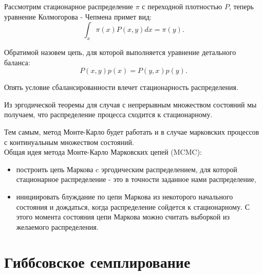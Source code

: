 \documentclass[14pt,a4paper]{article}
\begin{document}
Рассмотрим стационарное распределение $\pi$ с переходной плотностью $P$, теперь уравнение Колмогорова - Чепмена \cite{fell} примет вид:
\begin{equation}
  \int_{x} \pi(x)P(x,y)dx= \pi(y).
\end{equation}


Обратимой назовем цепь, для которой выполняется уравнение детального баланса:
\begin{equation}
    P(x,y)p(x) = P(y,x)p(y).
\end{equation}


Опять условие сбалансированности влечет стационарность распределения. 


Из эргодической теоремы для случая с непрерывным множеством состояний \cite{Bellet} мы получаем, что распределение процесса сходится к стационарному.
\[\]

Тем самым, метод Монте-Карло будет работать и в случае марковских процессов с континуальным множеством состояний.
\[\]
Общая идея метода Монте-Карло Марковских цепей (MCMC):
\begin{itemize}
    \item построить цепь Маркова c эргодическим распределением, для которой стационарное распределение - это в точности заданное нами распределение,
    \item инициировать блуждание по цепи Маркова из некоторого начального состояния и дождаться, когда распределение сойдется к стационарному. С этого момента состояния цепи Маркова можно считать выборкой из желаемого распределения.
\end{itemize}






\newpage
\section{Гиббсовское семплирование}
\end{document}
